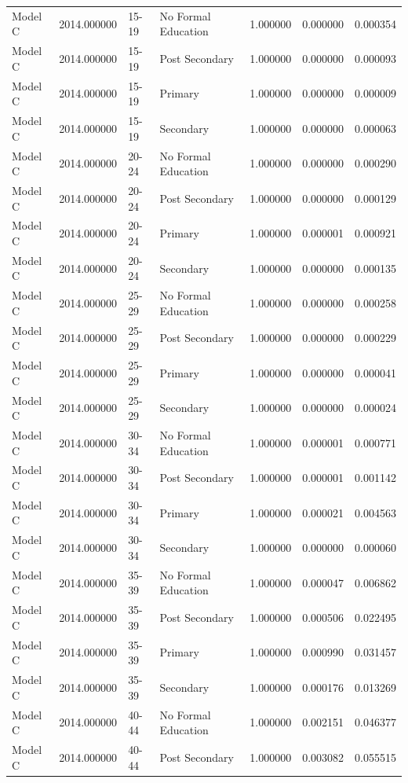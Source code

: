 \begin{table}[ht]
\begin{tabular}{lrllrrr}
Model C & 2014.000000 & 15-19 & No Formal Education & 1.000000 & 0.000000 & 0.000354 \\
Model C & 2014.000000 & 15-19 & Post Secondary & 1.000000 & 0.000000 & 0.000093 \\
Model C & 2014.000000 & 15-19 & Primary & 1.000000 & 0.000000 & 0.000009 \\
Model C & 2014.000000 & 15-19 & Secondary & 1.000000 & 0.000000 & 0.000063 \\
Model C & 2014.000000 & 20-24 & No Formal Education & 1.000000 & 0.000000 & 0.000290 \\
Model C & 2014.000000 & 20-24 & Post Secondary & 1.000000 & 0.000000 & 0.000129 \\
Model C & 2014.000000 & 20-24 & Primary & 1.000000 & 0.000001 & 0.000921 \\
Model C & 2014.000000 & 20-24 & Secondary & 1.000000 & 0.000000 & 0.000135 \\
Model C & 2014.000000 & 25-29 & No Formal Education & 1.000000 & 0.000000 & 0.000258 \\
Model C & 2014.000000 & 25-29 & Post Secondary & 1.000000 & 0.000000 & 0.000229 \\
Model C & 2014.000000 & 25-29 & Primary & 1.000000 & 0.000000 & 0.000041 \\
Model C & 2014.000000 & 25-29 & Secondary & 1.000000 & 0.000000 & 0.000024 \\
Model C & 2014.000000 & 30-34 & No Formal Education & 1.000000 & 0.000001 & 0.000771 \\
Model C & 2014.000000 & 30-34 & Post Secondary & 1.000000 & 0.000001 & 0.001142 \\
Model C & 2014.000000 & 30-34 & Primary & 1.000000 & 0.000021 & 0.004563 \\
Model C & 2014.000000 & 30-34 & Secondary & 1.000000 & 0.000000 & 0.000060 \\
Model C & 2014.000000 & 35-39 & No Formal Education & 1.000000 & 0.000047 & 0.006862 \\
Model C & 2014.000000 & 35-39 & Post Secondary & 1.000000 & 0.000506 & 0.022495 \\
Model C & 2014.000000 & 35-39 & Primary & 1.000000 & 0.000990 & 0.031457 \\
Model C & 2014.000000 & 35-39 & Secondary & 1.000000 & 0.000176 & 0.013269 \\
Model C & 2014.000000 & 40-44 & No Formal Education & 1.000000 & 0.002151 & 0.046377 \\
Model C & 2014.000000 & 40-44 & Post Secondary & 1.000000 & 0.003082 & 0.055515 \\

\end{tabular}
\end{table}
